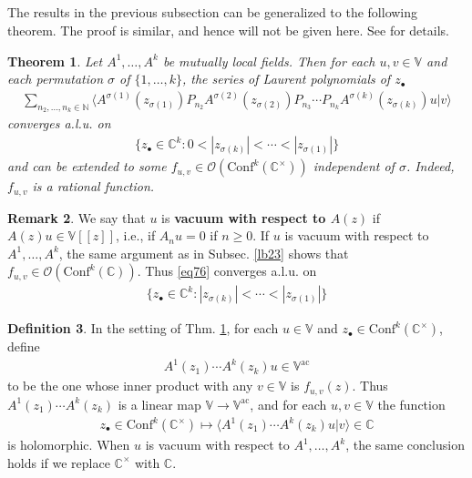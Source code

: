 \documentclass[12pt,b5paper,notitlepage]{article}
\theoremstyle{definition}
\newtheorem{df}{Definition}[section]
\newtheorem{rem}[df]{Remark}
\theoremstyle{plain}
\newtheorem{thm}[df]{Theorem}
\newcommand{\Conf}{\mathrm{Conf}}
\newcommand{\bk}[1]{\langle {#1}\rangle}
\newcommand{\scr}{\mathscr}
\newcommand{\blt}{\bullet}
\newcommand{\Vbb}{\mathbb V}
\newcommand{\Cbb}{\mathbb C}
\newcommand{\Nbb}{\mathbb N}
\newcommand{\ac}{\mathrm{ac}}
\numberwithin{equation}{section}
\begin{document}
\subsection{}


The results in the previous subsection can be generalized to the following theorem. The proof is similar, and hence will not be given here.  See \cite[Subsec. 8.2]{Gui-V} for details.


\begin{thm}\label{lb17}
Let $A^1,\dots,A^k$ be mutually local fields. Then for each $u,v\in\Vbb$ and each permutation $\sigma$ of $\{1,\dots,k\}$, the series of Laurent polynomials of $z_\blt$
\begin{align}\label{eq76}
\sum_{n_2,\dots,n_k\in\Nbb}\bk{A^{\sigma(1)}(z_{\sigma(1)})P_{n_2}A^{\sigma(2)}(z_{\sigma(2)})P_{n_3}\cdots P_{n_k} A^{\sigma(k)}(z_{\sigma(k)})u|v}
\end{align} 
converges a.l.u. on
\begin{align}
\{z_\blt\in\Cbb^k:0<|z_{\sigma(k)}|<\cdots<|z_{\sigma(1)}|\}
\end{align}
and can be extended to some $f_{u,v}\in\scr O(\Conf^k(\Cbb^\times))$ independent of $\sigma$. Indeed, $f_{u,v}$ is a rational function.
\end{thm}

\begin{rem}
We say that $u$ is \textbf{vacuum with respect to $A(z)$}  if $A(z)u\in\Vbb[[z]]$, i.e., if $A_nu=0$ if $n\geq0$. If $u$ is vacuum with respect to $A^1,\dots, A^k$, the same argument as in Subsec. \ref{lb23} shows that $f_{u,v}\in\scr O(\Conf^k(\Cbb))$. Thus \eqref{eq76} converges a.l.u. on
\begin{align*}
\{z_\blt\in\Cbb^k:|z_{\sigma(k)}|<\cdots<|z_{\sigma(1)}|\}
\end{align*}
\end{rem}



\begin{df}\label{lb46}
In the setting of Thm. \ref{lb17}, for each $u\in\Vbb$ and $z_\blt\in\Conf^k(\Cbb^\times)$, define
\begin{align}
A^1(z_1)\cdots A^k(z_k)u\in \Vbb^\ac
\end{align}
to be the one whose inner product with any $v\in\Vbb$ is $f_{u,v}(z)$. Thus $A^1(z_1)\cdots A^k(z_k)$ is a linear map $\Vbb\rightarrow\Vbb^\ac$, and for each $u,v\in\Vbb$ the function
\begin{align}\label{eq70}
z_\blt\in\Conf^k(\Cbb^\times)\mapsto \bk{A^1(z_1)\cdots A^k(z_k)u|v}\in\Cbb
\end{align}
is holomorphic. When $u$ is vacuum with respect to $A^1,\dots, A^k$, the same conclusion holds if we replace $\Cbb^\times$ with $\Cbb$.
\end{df}
\end{document}
